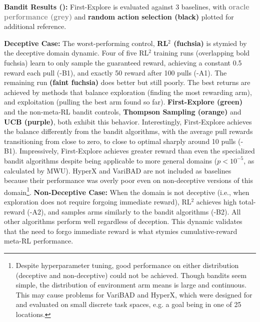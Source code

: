 \documentclass{article}
\begin{document}
\textbf{Bandit Results ():} First-Explore is evaluated against 3 baselines, with \textcolor{gray}{\textbf{oracle performance (grey)}} and 
\textbf{random action selection (black)} plotted for additional reference.

\textbf{Deceptive Case:} The worst-performing control, \textcolor{rl2}{\textbf{RL\(^2\) \citep{rl2, rl2alt}  (fuchsia)}} is stymied by the deceptive domain dynamic. Four of five RL\(^2\) training runs (overlapping bold fuchsia) learn to only sample the guaranteed reward, achieving a constant 0.5 reward each pull (-B1), and exactly 50 reward after 100 pulls (-A1). The remaining run \textbf{\textcolor{faintf}{(faint fuchsia)}} does better but still poorly. 
The best returns are achieved by methods that balance exploration (finding the most rewarding arm), and exploitation (pulling the best arm found so far).
\textcolor{fe}{\textbf{First-Explore (green)}} and the non-meta-RL bandit controls, \textcolor{ts}{\textbf{Thompson Sampling \citep{TS} (orange)}} and \textcolor{ucb}{\textbf{UCB \citep{rl2} (purple)}}, both exhibit this behavior. Interestingly, First-Explore achieves the balance differently from the bandit algorithms, with the average pull rewards transitioning from close to zero, to close to optimal sharply around 10 pulls (-B1). Impressively, First-Explore achieves greater reward than even the specialized bandit algorithms despite being applicable to more general domains (\(p < 10^{-5}\), as calculated by MWU). HyperX and VariBAD are not included as baselines because their performance was overly poor even on non-deceptive versions of this domain\footnote{Despite hyperparameter tuning, good performance on either distribution (deceptive and non-deceptive) could not be achieved. Though bandits seem simple, the distribution of environment arm means is large and continuous. This may cause problems for VariBAD and HyperX, which were designed for and evaluated on small discrete task spaces, e.g. a goal being in one of 25 locations.}. 
\textbf{Non-Deceptive Case:} When the domain is not deceptive (i.e., when exploration does not require forgoing immediate reward), RL\(^2\) achieves high total-reward (-A2), and samples arms similarly to the bandit algorithms (-B2). All other algorithms perform well regardless of deception. This dynamic validates that the need to forgo immediate reward is what stymies cumulative-reward meta-RL performance.
\end{document}
